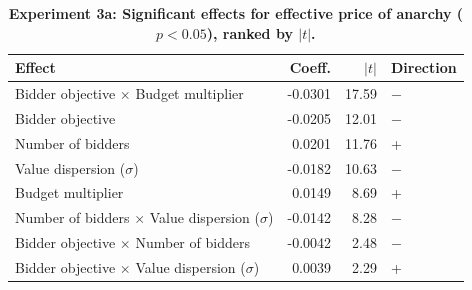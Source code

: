 \begin{table}[H]
\centering
\caption[Experiment 3a: Significant effects for effective price of anarchy ($p < 0.05$), ranked by $|t|$]{\textbf{Experiment 3a: Significant effects for effective price of anarchy ($p < 0.05$), ranked by $|t|$.}}
\label{tab:exp3a_ranked_poa}
\begin{tabular}{lrrl}
\toprule
\textbf{Effect} & \textbf{Coeff.} & \textbf{$|t|$} & \textbf{Direction} \\
\midrule
Bidder objective $\times$ Budget multiplier & -0.0301 & 17.59 & $-$ \\
Bidder objective & -0.0205 & 12.01 & $-$ \\
Number of bidders & 0.0201 & 11.76 & + \\
Value dispersion ($\sigma$) & -0.0182 & 10.63 & $-$ \\
Budget multiplier & 0.0149 & 8.69 & + \\
Number of bidders $\times$ Value dispersion ($\sigma$) & -0.0142 & 8.28 & $-$ \\
Bidder objective $\times$ Number of bidders & -0.0042 & 2.48 & $-$ \\
Bidder objective $\times$ Value dispersion ($\sigma$) & 0.0039 & 2.29 & + \\
\bottomrule
\end{tabular}
\end{table}
